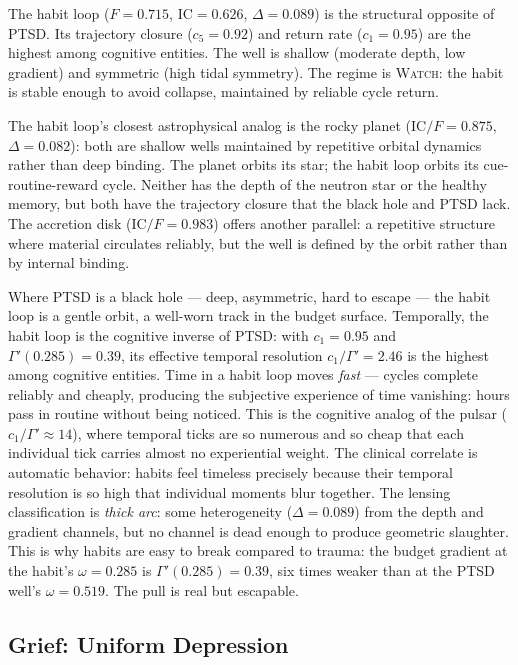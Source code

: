 \documentclass[
  aps,
  prd,
  twocolumn,
  superscriptaddress,
  nofootinbib,
  floatfix
]{revtex4-2}
\newcommand{\Gam}{\Gamma}
\newcommand{\regime}[1]{\textsc{#1}}
\newcommand{\IC}{\mathrm{IC}}
\begin{document}
The habit loop ($F = 0.715$, $\IC = 0.626$,
$\Delta = 0.089$) is the structural opposite of PTSD.
Its trajectory closure ($c_5 = 0.92$) and return rate
($c_1 = 0.95$) are the highest among cognitive entities.
The well is shallow (moderate depth, low gradient) and
symmetric (high tidal symmetry).  The regime is
\regime{Watch}: the habit is stable enough to avoid
collapse, maintained by reliable cycle return.

The habit loop's closest astrophysical analog is the rocky
planet ($\IC/F = 0.875$, $\Delta = 0.082$): both are
shallow wells maintained by repetitive orbital dynamics
rather than deep binding.  The planet orbits its star;
the habit loop orbits its cue-routine-reward cycle.  Neither
has the depth of the neutron star or the healthy memory,
but both have the trajectory closure that the black hole
and PTSD lack.  The accretion disk ($\IC/F = 0.983$)
offers another parallel: a repetitive structure where
material circulates reliably, but the well is defined by
the orbit rather than by internal binding.

Where PTSD is a black hole --- deep, asymmetric, hard to
escape --- the habit loop is a gentle orbit, a well-worn
track in the budget surface.  Temporally, the habit loop is
the cognitive inverse of PTSD: with $c_1 = 0.95$ and
$\Gam'(0.285) = 0.39$, its effective temporal resolution
$c_1/\Gam' = 2.46$ is the highest among cognitive entities.
Time in a habit loop moves \emph{fast} --- cycles complete
reliably and cheaply, producing the subjective experience
of time vanishing: hours pass in routine without being
noticed.  This is the cognitive analog of the pulsar
($c_1/\Gam' \approx 14$), where temporal ticks are so
numerous and so cheap that each individual tick carries
almost no experiential weight.  The clinical correlate
is automatic behavior: habits feel timeless precisely
because their temporal resolution is so high that
individual moments blur together.  The lensing classification
is \emph{thick arc}: some heterogeneity
($\Delta = 0.089$) from the depth and gradient channels,
but no channel is dead enough to produce geometric
slaughter.  This is why habits are easy to break
compared to trauma: the budget gradient at the habit's
$\omega = 0.285$ is $\Gam'(0.285) = 0.39$, six times
weaker than at the PTSD well's $\omega = 0.519$.  The pull
is real but escapable.


\subsection{Grief: Uniform Depression}
\end{document}
